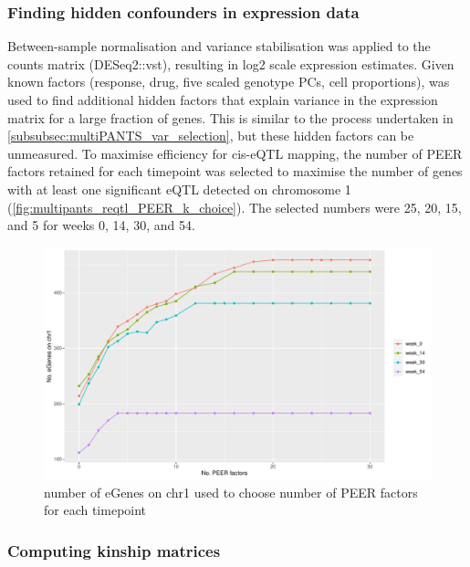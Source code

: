 \begin{outline}
\subsubsection{Finding hidden confounders in expression data}

Between-sample normalisation and variance stabilisation was applied to the counts matrix (DESeq2::vst), resulting in log2 scale expression estimates.
Given known factors (response, drug, five scaled genotype \glspl{PC}, cell proportions), 
 was used to find additional hidden factors that explain variance in the expression matrix for a large fraction of genes.
This is similar to the process undertaken in \autoref{subsubsec:multiPANTS_var_selection}, but these hidden factors can be unmeasured.
To maximise efficiency for cis-\gls{eQTL} mapping, 
the number of PEER factors retained for each timepoint was selected to maximise the number of genes with at least one significant \gls{eQTL} detected on chromosome 1 (\autoref{fig:multipants_reqtl_PEER_k_choice}).
The selected numbers were 25, 20, 15, and 5 for weeks 0, 14, 30, and 54.

\begin{figure}
    \centering
    \includegraphics[width=1.0\textwidth,page=1]{mainmatter/figures/chapter_04/count_eGenes.signif_eGenes_vs_PEER_n.dataset_multiPANTS.chr_1.pdf}
    \caption{number of eGenes on chr1 used to choose number of PEER factors for each timepoint}
    \label{fig:multipants_reqtl_PEER_k_choice}
\end{figure}

\subsubsection{Computing kinship matrices}


\end{outline}

